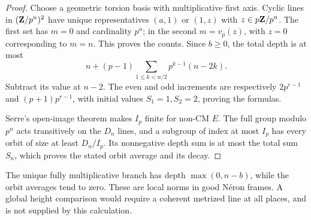 \documentclass[11pt]{article}
\theoremstyle{definition}\newtheorem{definition}[theorem]{Definition}
\theoremstyle{remark}\newtheorem{remark}[theorem]{Remark}
\begin{document}
\begin{proof}
Choose a geometric torsion basis with multiplicative first axis. Cyclic lines in $(\mathbf Z/p^n)^2$ have unique representatives $(a,1)$ or $(1,z)$ with $z\in p\mathbf Z/p^n$. The first set has $m=0$ and cardinality $p^n$; in the second $m=v_p(z)$, with $z=0$ corresponding to $m=n$. This proves the counts. Since $b\ge0$, the total depth is at most
\[
             n+(p-1)\sum_{1\le k<n/2}p^{k-1}(n-2k).
\]
Subtract its value at $n-2$. The even and odd increments are respectively $2p^{r-1}$ and $(p+1)p^{r-1}$, with initial values $S_1=1,S_2=2$, proving the formulas.

Serre's open-image theorem \cite[\S4.4, Th\'eor\`eme~3 and $3'$, p.~299]{SerreAdelic} makes $I_p$ finite for non-CM $E$. The full group modulo $p^n$ acts transitively on the $D_n$ lines, and a subgroup of index at most $I_p$ has every orbit of size at least $D_n/I_p$. Its nonnegative depth sum is at most the total sum $S_n$, which proves the stated orbit average and its decay.
\end{proof}

The unique fully multiplicative branch has depth $\max(0,n-b)$, while the orbit averages tend to zero. These are local norms in good N\'eron frames. A global height comparison would require a coherent metrized line at all places, and is not supplied by this calculation.
\end{document}
